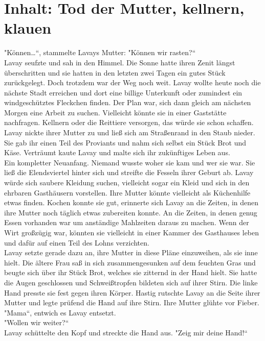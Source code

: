 \chapter{Inhalt: Tod der Mutter, kellnern, klauen}


"Können…``, stammelte Lavays Mutter: "Können wir rasten?``\\
Lavay seufzte und sah in den Himmel. Die Sonne hatte ihren Zenit längst überschritten und sie 
hatten in den letzten zwei Tagen ein gutes Stück zurückgelegt. Doch trotzdem war der Weg noch weit. 
Lavay wollte heute noch die nächste Stadt erreichen und dort eine billige Unterkunft oder 
zumindest ein windgeschütztes Fleckchen finden. Der Plan war, sich dann gleich am nächsten Morgen 
eine Arbeit zu suchen. Vielleicht könnte sie in einer Gaststätte nachfragen. Kellnern oder die 
Reittiere versorgen, das würde sie schon schaffen. Lavay nickte ihrer Mutter zu und ließ sich am 
Straßenrand in den Staub nieder. Sie gab ihr einen Teil des Proviants und nahm sich selbst ein Stück 
Brot und Käse. Verträumt kaute Lavay und malte sich ihr zukünftiges Leben aus. \\
Ein kompletter Neuanfang. Niemand wusste woher sie kam und wer sie war. Sie ließ die Elendsviertel 
hinter sich und streifte die Fesseln ihrer Geburt ab. Lavay würde sich saubere Kleidung suchen, 
vielleicht sogar ein Kleid und sich in den ehrbaren Gasthäusern vorstellen. Ihre Mutter könnte 
vielleicht als Küchenhilfe etwas finden. Kochen konnte sie gut, erinnerte sich 
Lavay an die Zeiten, in denen ihre Mutter noch täglich etwas zubereiten konnte. An die Zeiten, in 
denen genug Essen vorhanden war um anständige Mahlzeiten daraus zu machen. Wenn der Wirt großzügig 
war, könnten sie vielleicht in einer Kammer des Gasthauses leben und dafür auf einen Teil des Lohns 
verzichten.\\
Lavay setzte gerade dazu an, ihre Mutter in diese Pläne einzuweihen, als sie inne hielt. Die ältere 
Frau saß in sich zusammengesunken auf dem feuchten Gras und beugte sich über ihr Stück Brot, 
welches sie zitternd in der Hand hielt. Sie hatte die Augen geschlossen und Schweißtropfen 
bildeten sich auf ihrer Stirn. Die linke Hand presste sie fest gegen ihren Körper. Hastig rutschte 
Lavay an die Seite ihrer Mutter und legte prüfend die Hand auf ihre Stirn. Ihre Mutter glühte vor 
Fieber.\\
"Mama``, entwich es Lavay entsetzt.\\
"Wollen wir weiter?``\\
Lavay schüttelte den Kopf und streckte die Hand aus. "Zeig mir deine Hand!``\\
